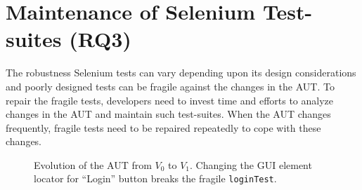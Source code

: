 


\section{Maintenance of Selenium Test-suites (RQ3)}
\label{locatorMaintenance}
The robustness Selenium tests can vary depending upon its design considerations and poorly designed tests can be fragile against the changes in the AUT. To repair the fragile tests, developers need to invest time and efforts to analyze changes in the AUT and maintain such test-suites. When the AUT changes frequently, fragile tests need to be repaired repeatedly to cope with these changes. 

\begin{figure}[ht!]
\centering     %
{}
\vspace{-2mm}
  \captionsetup{justification=justified,
singlelinecheck=false}
\caption{Evolution of the AUT from $V_{0}$ to $V_{1}$. Changing the GUI element locator for ``Login'' button breaks the fragile \texttt{loginTest}.}
\label{fig:3loginTest}
\end{figure} 

